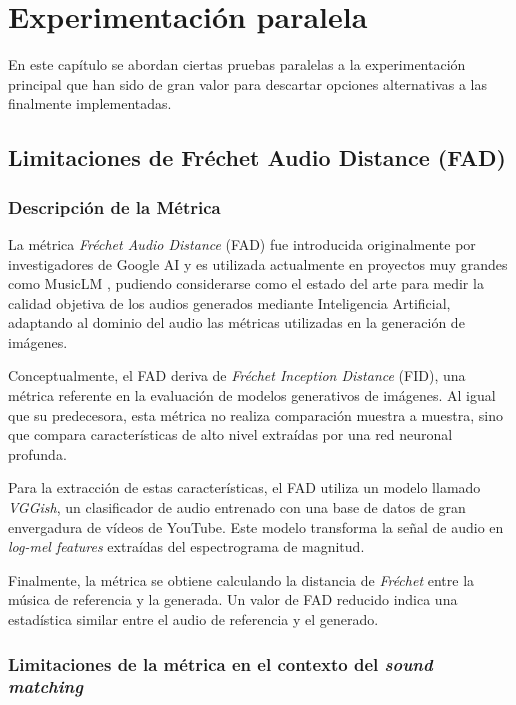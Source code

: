 \chapter{Experimentación paralela}
\label{cap:ExperimentacionPrevia}

En este capítulo se abordan ciertas pruebas paralelas a la experimentación principal que han sido de gran valor para descartar opciones alternativas a las finalmente implementadas. 

\section{Limitaciones de Fréchet Audio Distance (FAD)}
\subsection{Descripción de la Métrica}
La métrica \textit{Fréchet Audio Distance} (FAD) \citep{kilgour19_interspeech} fue introducida originalmente por investigadores de Google AI y es utilizada actualmente en proyectos muy grandes como 
MusicLM \citep{agostinelli2023musiclm}, pudiendo considerarse como el estado del arte para medir la calidad objetiva de los audios generados mediante Inteligencia Artificial, adaptando al dominio del audio las métricas utilizadas en la generación de imágenes.

Conceptualmente, el FAD deriva de \textit{Fréchet Inception Distance} (FID), una métrica referente en la evaluación de modelos generativos de imágenes.
Al igual que su predecesora, esta métrica no realiza comparación muestra a muestra, sino que compara características de alto nivel extraídas por una red neuronal profunda.

Para la extracción de estas características, el FAD utiliza un modelo llamado \textit{VGGish}, un clasificador de audio entrenado con una base de datos 
de gran envergadura de vídeos de YouTube. Este modelo transforma la señal de audio en \textit{log-mel features} extraídas del espectrograma de magnitud.

Finalmente, la métrica se obtiene calculando la distancia de \textit{Fréchet} entre la música de referencia y la generada. Un valor de FAD reducido indica una estadística similar entre el audio de referencia y el generado.

\subsection{Limitaciones de la métrica en el contexto del \textit{sound matching}}

